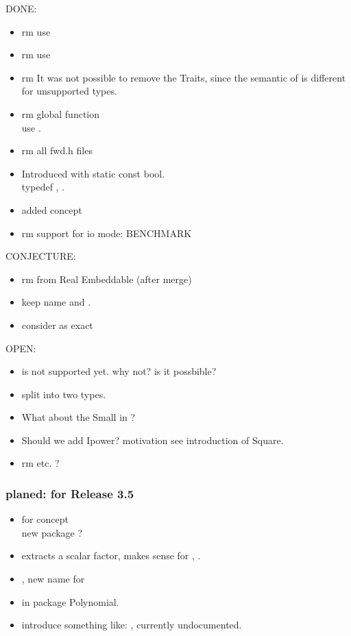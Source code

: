 DONE:

\begin{itemize}
\item rm  use 
\item rm  use 
\item rm  It was not possible to remove the Traits, since  
      the semantic of  is different for unsupported types.
\item rm global function \\
      use .
\item rm all fwd.h files    
\item Introduced  with static const bool. \\
      typedef , . 
\item added concept 
\item rm support for io mode: BENCHMARK 
\end{itemize}

CONJECTURE:
\begin{itemize}
\item rm  from Real Embeddable (after merge)
\item keep name  and .
\item consider  as exact 
\end{itemize}


OPEN:
\begin{itemize}
\item {} is not supported yet. why not? is it possbible?  
\item split  into two types. 
\item What about the Small in ?
\item Should we add Ipower? motivation see introduction of Square.
\item rm  etc. ? 
\end{itemize}

\subsubsection{planed: for Release 3.5}
\begin{itemize}
\item {} for concept \\
      new package ? 
\item {} extracts a scalar factor, 
      makes sense for , . 
\item {}, new name for 
\item {} in package Polynomial. 
\item introduce something like: , currently undocumented.     
\end{itemize}

